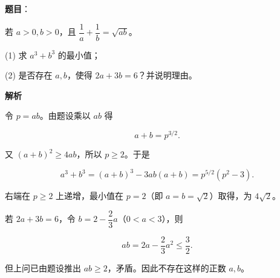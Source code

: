 \begin{answer}

\textbf{题目}：

若 $a>0,b>0$，且 $\dfrac1a+\dfrac1b=\sqrt{ab}$。

(1) 求 $a^3+b^3$ 的最小值；

(2) 是否存在 $a,b$，使得 $2a+3b=6$？并说明理由。

\textbf{解析}


令 $p=ab$。由题设乘以 $ab$ 得

\nopagebreak[4]
\[
a+b=p^{3/2}.
\]

又 $(a+b)^2\geqslant4ab$，所以 $p\geqslant2$。于是

\nopagebreak[4]
\[
a^3+b^3=(a+b)^3-3ab(a+b)=p^{5/2}(p^2-3).
\]

右端在 $p\geqslant2$ 上递增，最小值在 $p=2$（即 $a=b=\sqrt2$）取得，为 $4\sqrt2$。


若 $2a+3b=6$，令 $b=2-\dfrac23a$（$0<a<3$），则

\nopagebreak[4]
\[
ab=2a-\frac23a^2\leqslant\frac32.
\]

但上问已由题设推出 $ab\geqslant2$，矛盾。因此不存在这样的正数 $a,b$。



\end{answer}